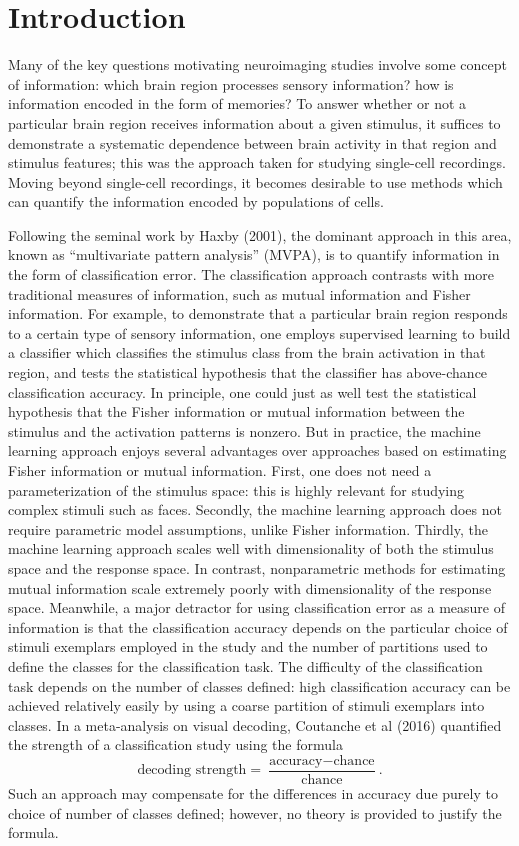 \documentclass[12pt]{article}
\begin{document}
\section{Introduction}

Many of the key questions motivating neuroimaging studies involve some concept of information:
which brain region processes sensory information?  how is information encoded in the form of memories?
To answer whether or not a particular brain region receives information about a given stimulus,
it suffices to demonstrate a systematic dependence between brain activity in that region and stimulus features;
this was the approach taken for studying single-cell recordings.
Moving beyond single-cell recordings, it becomes desirable to use methods which can quantify
the information encoded by populations of cells.

Following the seminal work by Haxby (2001), the dominant approach in this area,
known as ``multivariate pattern analysis'' (MVPA), is to quantify information in the form of classification error.
The classification approach contrasts with more traditional measures of information, such as mutual information and Fisher information.
For example, to demonstrate that a particular brain region responds to a certain type of sensory information,
one employs supervised learning to build a classifier which classifies the stimulus class from the brain activation in that region,
and tests the statistical hypothesis that the classifier has above-chance classification accuracy.
In principle, one could just as well test the statistical hypothesis that the Fisher information or mutual information between
the stimulus and the activation patterns is nonzero.  But in practice, the machine learning approach enjoys several advantages over
approaches based on estimating Fisher information or mutual information.
First, one does not need a parameterization of the stimulus space: this is highly relevant for studying complex stimuli such as faces.
Secondly, the machine learning approach does not require parametric model assumptions, unlike Fisher information.
Thirdly, the machine learning approach scales well with dimensionality of both the stimulus space and the response space.
In contrast, nonparametric methods for estimating mutual information scale extremely poorly with dimensionality of the response space.
Meanwhile, a major detractor for using classification error as a measure of information is that the classification accuracy depends on the particular choice of stimuli exemplars employed in the study and the number of partitions used to define the classes for the classification task.
The difficulty of the classification task depends on the number of classes defined: high classification accuracy can be achieved relatively easily by using a coarse partition of stimuli exemplars into classes.
In a meta-analysis on visual decoding, Coutanche et al (2016) quantified the strength of a classification study
using the formula
\[
\text{decoding strength} = \frac{\text{accuracy} - \text{chance}}{\text{chance}}.
\]
Such an approach may compensate for the differences in accuracy due purely to choice of number of classes defined;
however, no theory is provided to justify the formula.
\end{document}
